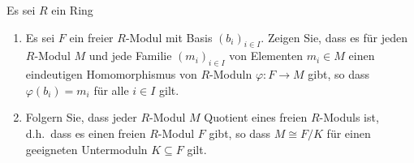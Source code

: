 \begin{question}[subtitle = Jeder Modul ist Quotient eines freien Moduls]
  \label{question: interaction of free modues with other modules}
  Es sei $R$ ein Ring
  \begin{enumerate}
    \item
      Es sei $F$ ein freier $R$-Modul mit Basis $(b_i)_{i \in I}$.
      Zeigen Sie, dass es für jeden $R$-Modul $M$ und jede Familie $(m_i)_{i \in I}$ von Elementen $m_i \in M$ einen eindeutigen Homomorphismus von $R$-Moduln $\varphi \colon F \to M$ gibt, so dass $\varphi(b_i) = m_i$ für alle $i \in I$ gilt.
    \item
      Folgern Sie, dass jeder $R$-Modul $M$ Quotient eines freien $R$-Moduls ist, d.h.\ dass es einen freien $R$-Modul $F$ gibt, so dass $M \cong F/K$ für einen geeigneten Untermoduln $K \subseteq F$ gilt.
  \end{enumerate}
\end{question}


